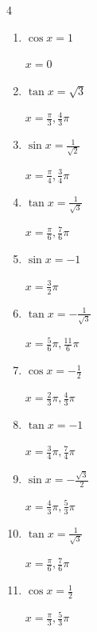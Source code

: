 \begin{multicols}{4}
\begin{enumerate}
        $\displaystyle x = \frac{3}{4}\pi , \frac{5}{4}\pi$

  \item $\displaystyle \cos{x}  = 1$

        $\displaystyle x = 0$

  \item $\displaystyle \tan{x}  = \sqrt{3}$

        $\displaystyle x = \frac{\pi}{3} , \frac{4}{3}\pi$

  \item $\displaystyle \sin{x}  = \frac{1}{\sqrt{2}}$

        $\displaystyle x = \frac{\pi}{4} , \frac{3}{4}\pi$

  \item $\displaystyle \tan{x}  = \frac{1}{\sqrt{3}}$

        $\displaystyle x = \frac{\pi}{6} , \frac{7}{6}\pi$

  \item $\displaystyle \sin{x}  = -1$

        $\displaystyle x = \frac{3}{2}\pi$

  \item $\displaystyle \tan{x}  = -\frac{1}{\sqrt{3}}$

        $\displaystyle x = \frac{5}{6}\pi , \frac{11}{6}\pi$

  \item $\displaystyle \cos{x}  = -\frac{1}{2}$

        $\displaystyle x = \frac{2}{3}\pi , \frac{4}{3}\pi$

\columnbreak %

  \item $\displaystyle \tan{x}  = -1$

        $\displaystyle x = \frac{3}{4}\pi , \frac{7}{4}\pi$

  \item $\displaystyle \sin{x}  = -\frac{\sqrt{3}}{2}$

        $\displaystyle x = \frac{4}{3}\pi , \frac{5}{3}\pi$

  \item $\displaystyle \tan{x}  = \frac{1}{\sqrt{3}}$

        $\displaystyle x = \frac{\pi}{6} , \frac{7}{6}\pi$

  \item $\displaystyle \cos{x}  = \frac{1}{2}$

        $\displaystyle x = \frac{\pi}{3} , \frac{5}{3}\pi$


\end{enumerate}
\end{multicols}
